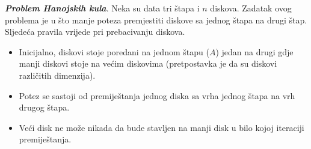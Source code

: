  \begin{example}
 	\textbf{\emph{Problem Hanojskih kula}}. Neka su data tri štapa i $n$ diskova. Zadatak ovog problema je u što manje poteza
 	premjestiti diskove sa jednog štapa na drugi štap. Sljedeća pravila vrijede pri prebacivanju diskova. 
 	\begin{itemize}
 		\item Inicijalno, diskovi stoje poredani na jednom štapu ($A$) jedan na drugi gdje  manji diskovi stoje na većim diskovima (pretpostavka je da su diskovi različitih dimenzija). 
 		\item Potez se sastoji od premiještanja jednog diska sa vrha jednog štapa na vrh drugog štapa.   
 		\item Veći disk ne može nikada da bude stavljen na manji disk u bilo kojoj iteraciji premiještanja.
 	\end{itemize}
  \end{example}    

